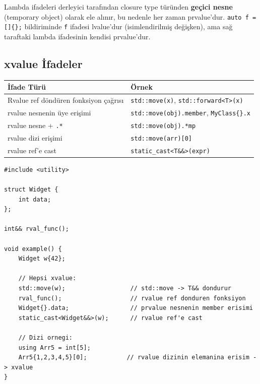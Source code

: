 \documentclass[a4paper,12pt]{article}
\begin{document}
\begin{notebox}
Lambda ifadeleri derleyici tarafından closure type türünden \textbf{geçici nesne} (temporary object) olarak ele alınır, bu nedenle her zaman prvalue'dur. \texttt{auto f = []\{\};} bildiriminde \texttt{f} ifadesi lvalue'dur (isimlendirilmiş değişken), ama sağ taraftaki lambda ifadesinin kendisi prvalue'dur.
\end{notebox}

\subsection{xvalue İfadeler}

\begin{table}[h]
\centering
\small
\begin{tabular}{@{}p{5.5cm}p{5.5cm}@{}}
\toprule
\textbf{İfade Türü} & \textbf{Örnek} \\
\midrule
Rvalue ref döndüren fonksiyon çağrısı & \texttt{std::move(x)}, \texttt{std::forward<T>(x)} \\
rvalue nesnenin üye erişimi & \texttt{std::move(obj).member}, \texttt{MyClass\{\}.x} \\
rvalue nesne + \texttt{.*} & \texttt{std::move(obj).*mp} \\
rvalue dizi erişimi & \texttt{std::move(arr)[0]} \\
rvalue ref'e cast & \texttt{static\_cast<T\&\&>(expr)} \\
\bottomrule
\end{tabular}
\end{table}

\begin{lstlisting}
#include <utility>

struct Widget {
    int data;
};

int&& rval_func();

void example() {
    Widget w{42};

    // Hepsi xvalue:
    std::move(w);                  // std::move -> T&& dondurur
    rval_func();                   // rvalue ref donduren fonksiyon
    Widget{}.data;                 // prvalue nesnenin member erisimi
    static_cast<Widget&&>(w);      // rvalue ref'e cast

    // Dizi ornegi:
    using Arr5 = int[5];
    Arr5{1,2,3,4,5}[0];           // rvalue dizinin elemanina erisim -> xvalue
}
\end{lstlisting}

\end{document}
